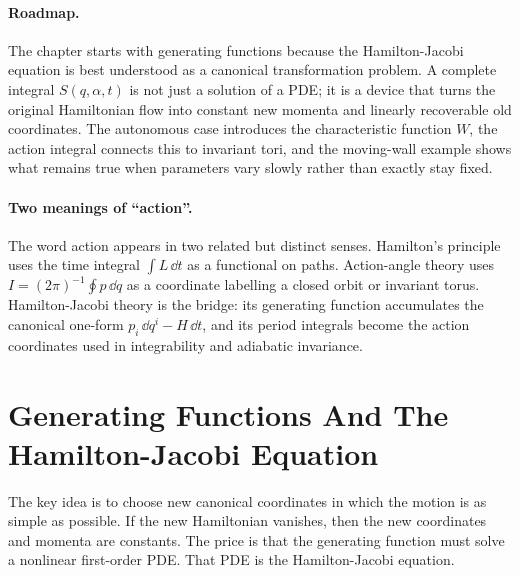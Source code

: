 \paragraph{Roadmap.}
The chapter starts with generating functions because the Hamilton-Jacobi
equation is best understood as a canonical transformation problem. A complete
integral \(S(q,\alpha,t)\) is not just a solution of a PDE; it is a device that
turns the original Hamiltonian flow into constant new momenta and linearly
recoverable old coordinates. The autonomous case introduces the characteristic
function \(W\), the action integral connects this to invariant tori, and the
moving-wall example shows what remains true when parameters vary slowly rather
than exactly stay fixed.

\paragraph{Two meanings of ``action''.}
The word action appears in two related but distinct senses. Hamilton's
principle uses the time integral \(\int L\,\dd t\) as a functional on paths.
Action-angle theory uses \(I=(2\pi)^{-1}\oint p\,\dd q\) as a coordinate
labelling a closed orbit or invariant torus. Hamilton-Jacobi theory is the
bridge: its generating function accumulates the canonical one-form
\(p_i\,\dd q^i-H\,\dd t\), and its period integrals become the action
coordinates used in integrability and adiabatic invariance.

\section{Generating Functions And The Hamilton-Jacobi Equation}
\label{sec:hj-generating-function}

The key idea is to choose new canonical coordinates in which the motion is as
simple as possible. If the new Hamiltonian vanishes, then the new coordinates
and momenta are constants. The price is that the generating function must solve
a nonlinear first-order PDE. That PDE is the Hamilton-Jacobi equation.


